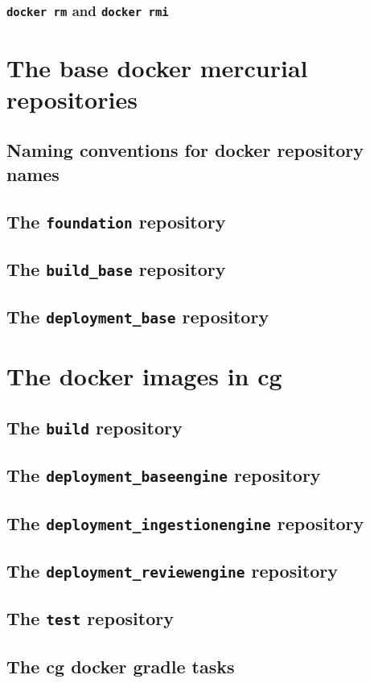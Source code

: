 			\subsubsection{\texttt{docker rm} and \texttt{docker rmi}}
	\section{The base docker mercurial repositories}
		\subsection{Naming conventions for docker repository names}
		\subsection{The \texttt{foundation} repository}
		\subsection{The \texttt{build\_base} repository}
		\subsection{The \texttt{deployment\_base} repository}
	\section{The docker images in cg}
		\subsection{The \texttt{build} repository}
		\subsection{The \texttt{deployment\_baseengine} repository}
		\subsection{The \texttt{deployment\_ingestionengine} repository}
		\subsection{The \texttt{deployment\_reviewengine} repository}
		\subsection{The \texttt{test} repository}
		\subsection{The cg docker gradle tasks}